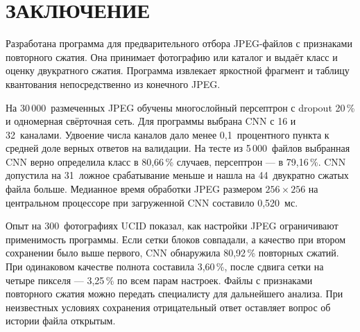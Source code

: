 \chapter*{ЗАКЛЮЧЕНИЕ}

Разработана программа для предварительного отбора JPEG-файлов с признаками повторного сжатия. Она принимает фотографию или каталог и выдаёт класс и оценку двукратного сжатия. Программа извлекает яркостной фрагмент и таблицу квантования непосредственно из конечного JPEG.

На 30\,000~размеченных JPEG обучены многослойный персептрон с dropout 20\,\% и одномерная свёрточная сеть. Для программы выбрана CNN с 16 и 32~каналами. Удвоение числа каналов дало менее 0,1~процентного пункта к средней доле верных ответов на валидации. На тесте из 5\,000~файлов выбранная CNN верно определила класс в 80,66\,\% случаев, персептрон --- в 79,16\,\%. CNN допустила на 31~ложное срабатывание меньше и нашла на 44~двукратно сжатых файла больше. Медианное время обработки JPEG размером $256\times256$ на центральном процессоре при загруженной CNN составило 0,520~мс.

Опыт на 300~фотографиях UCID показал, как настройки JPEG ограничивают применимость программы. Если сетки блоков совпадали, а качество при втором сохранении было выше первого, CNN обнаружила 80,92\,\% повторных сжатий. При одинаковом качестве полнота составила 3,60\,\%, после сдвига сетки на четыре пикселя --- 3,25\,\% по всем парам настроек. Файлы с признаками повторного сжатия можно передать специалисту для дальнейшего анализа. При неизвестных условиях сохранения отрицательный ответ оставляет вопрос об истории файла открытым.
